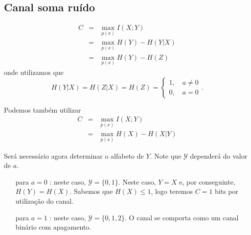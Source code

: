 \subsection{Canal soma ruído}
\begin{questions}


\begin{solution}
\begin{eqnarray}
C &=& \max_{p(x)} I(X;Y) \nonumber \\
        &=& \max_{p(x)} H(Y) - H(Y|X) \nonumber \\
        &=& \max_{p(x)} H(Y) - H(Z)
\end{eqnarray}
onde utilizamos que
\begin{equation}
H(Y|X) = H(Z|X) = H(Z) = \begin{cases} 1 , \quad a \neq 0 \\ 0, \quad a = 0 \end{cases}.
\end{equation}

Podemos também utilizar
\begin{eqnarray}
C &=& \max_{p(x)} I(X;Y) \\
        &=& \max_{p(x)} H(X) - H(X|Y) 
\end{eqnarray}

Será necessário agora determinar o alfabeto de $Y$. 
Note que $\mathcal{Y}$ dependerá do valor de $a$.

\begin{enumerate}
\item[para $a = 0$]: neste caso, $\mathcal{Y} = \{0,1\}$. Neste caso, $Y=X$ e, por conseguinte,
$H(Y) = H(X)$. Sabemos que $H(X) \leq 1$, logo teremos $C=1$ bits por utilização do canal. 
\item[para $a = 1$]: neste caso, $\mathcal{Y} = \{0,1,2\}$. O canal se comporta como um
canal binário com apagamento.


\end{enumerate}
\end{solution}
\end{questions}
